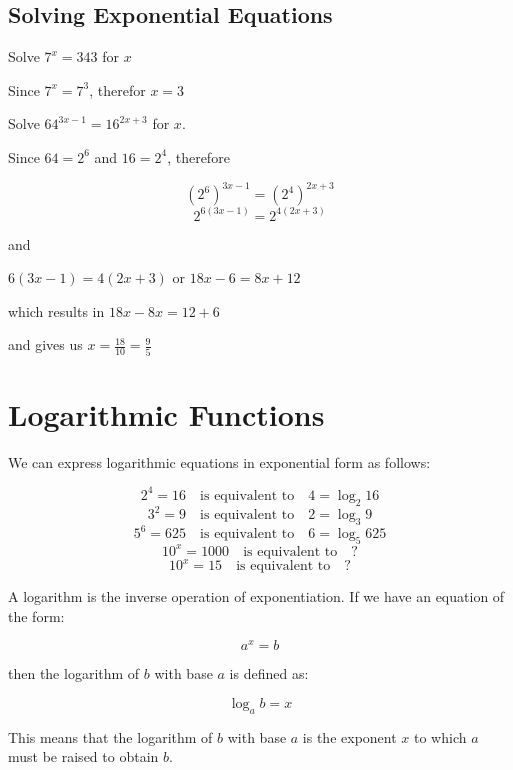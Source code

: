 \subsection{Solving Exponential Equations}

\begin{example} 

  Solve \(7^{x} = 343 \) for $x$

  Since \(7^{x} = 7^{3} \), therefor $x=3$


\end{example}


\begin{example}
  Solve \(64^{3x-1} = 16^{2x+3}\) for \(x\).
  
  Since \(64 = 2^6\) and \(16 = 2^4\), therefore
  
  \[
  \left( 2^6 \right)^{3x-1} = \left( 2^4 \right)^{2x+3}
  \]
  \[
  2^{6(3x-1)} = 2^{4(2x+3)}
  \]
  
 and
  
  \(6(3x-1) = 4(2x+3) \)
  or
  \(18x - 6 = 8x + 12 \)
  
  which results in 
  \(18x - 8x = 12 + 6 \)

   and gives us 
   \(x = \frac{18}{10} = \frac{9}{5} \)
  


\end{example}

\section{Logarithmic Functions}

We can express logarithmic equations in exponential form as follows:

\[
2^4 = 16 \quad \text{is equivalent to} \quad 4 = \log_2 16
\]
\[
3^2 = 9 \quad \text{is equivalent to} \quad 2 = \log_3 9
\]
\[
5^6 = 625 \quad \text{is equivalent to} \quad 6 = \log_5 625
\]
\[
10^x = 1000 \quad \text{is equivalent to} \quad ?
\]
\[
10^x = 15 \quad \text{is equivalent to} \quad ?
\]
\begin{definition}
[Logarithm]
A logarithm is the inverse operation of exponentiation. If we have an equation of the form:

\[
a^x = b
\]

then the logarithm of \( b \) with base \( a \) is defined as:

\[
\log_a b = x
\]
\end{definition}
This means that the logarithm of \( b \) with base \( a \) is the exponent \( x \) to which \( a \) must be raised to obtain \( b \).


